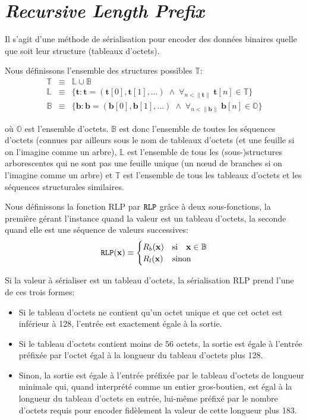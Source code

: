 \documentclass[9pt,oneside]{amsart}
\begin{document}
\section{\textit{Recursive Length Prefix}}\label{app:rlp}
Il s'agit d'une méthode de sérialisation pour encoder des données binaires quelle que soit leur structure (tableaux d'octets).

Nous définissons l'ensemble des structures possibles $\mathbb{T}$:
\begin{eqnarray}
\mathbb{T} & \equiv & \mathbb{L} \cup \mathbb{B} \\
\mathbb{L} & \equiv & \{ \mathbf{t}: \mathbf{t} = ( \mathbf{t}[0], \mathbf{t}[1], ... ) \; \wedge \; \forall_{n < \lVert \mathbf{t} \rVert} \; \mathbf{t}[n] \in \mathbb{T} \} \\
\mathbb{B} & \equiv & \{ \mathbf{b}: \mathbf{b} = ( \mathbf{b}[0], \mathbf{b}[1], ... ) \; \wedge \; \forall_{n < \lVert \mathbf{b} \rVert} \; \mathbf{b}[n] \in \mathbb{O} \}
\end{eqnarray}

où $\mathbb{O}$ est l'ensemble d'octets. $\mathbb{B}$  est donc l'ensemble de toutes les séquences d'octets (connues par ailleurs sous le nom de tableaux d'octets (et une feuille si on l'imagine comme un arbre), $\mathbb{L}$ est l'ensemble de tous les (sous-)structures arborescentes qui ne sont pas une feuille unique (un n\oe{}ud de branches si on l'imagine comme un arbre) et  $\mathbb{T}$ est l'ensemble de tous les tableaux d'octets et les séquences structurales similaires.

Nous définissons la fonction RLP par $\mathtt{\tiny RLP}$ grâce à deux sous-fonctions, la première gérant l'instance quand la valeur est un tableau d'octets, la seconde quand elle est une séquence de valeurs successives:
\begin{equation}
\mathtt{\tiny RLP}(\mathbf{x}) \equiv \begin{cases} R_b(\mathbf{x}) & \text{si} \quad \mathbf{x} \in \mathbb{B} \\ R_l(\mathbf{x}) & \text{sinon} \end{cases}
\end{equation}

Si la valeur à sérialiser est un tableau d'octets, la sérialisation RLP prend l'une de ces trois formes:

\begin{itemize}
\item
  Si le tableau d'octets ne contient qu'un octet unique et que cet octet est inférieur à 128, l'entrée est exactement égale à la sortie.
\item
  Si le tableau d'octets contient moins de 56 octets, la sortie est égale à l'entrée préfixée par l'octet égal à la longueur du tableau d'octets plus 128.
\item
  Sinon, la sortie est égale à l'entrée préfixée par le tableau d'octets de longueur minimale qui, quand interprété comme un entier gros-boutien, est égal à la longueur du tableau d'octets en entrée, lui-même préfixé par le nombre d'octets requis pour encoder fidèlement la valeur de cette longueur plus 183.
\end{itemize}
\end{document}
